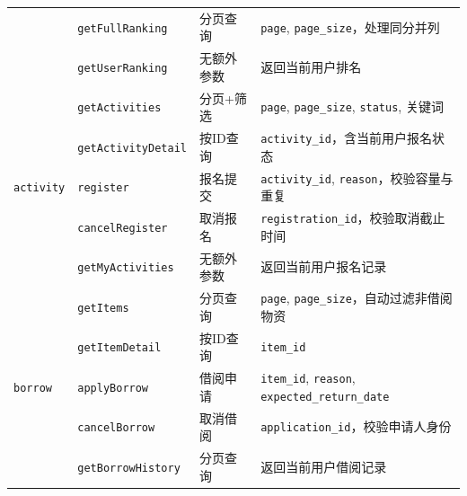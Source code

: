 \documentclass[a4paper,12pt]{article}
\begin{document}
\begin{table}[H]
{\begin{tabular}{p{2.4cm} p{3.6cm} p{2.6cm} p{5.2cm}}
                                               & \texttt{getFullRanking}     & 分页查询          & \texttt{page}, \texttt{page\_size}，处理同分并列                           \\
                                               & \texttt{getUserRanking}     & 无额外参数         & 返回当前用户排名                                                            \\
      \midrule
      \multirow{5}{*}{\texttt{activity}}       & \texttt{getActivities}      & 分页+筛选         & \texttt{page}, \texttt{page\_size}, \texttt{status}, 关键词            \\
                                               & \texttt{getActivityDetail}  & 按ID查询         & \texttt{activity\_id}，含当前用户报名状态                                     \\
                                               & \texttt{register}           & 报名提交          & \texttt{activity\_id}, \texttt{reason}，校验容量与重复                      \\
                                               & \texttt{cancelRegister}     & 取消报名          & \texttt{registration\_id}，校验取消截止时间                                  \\
                                               & \texttt{getMyActivities}    & 无额外参数         & 返回当前用户报名记录                                                          \\
      \midrule
      \multirow{6}{*}{\texttt{borrow}}         & \texttt{getItems}           & 分页查询          & \texttt{page}, \texttt{page\_size}，自动过滤非借阅物资                        \\
                                               & \texttt{getItemDetail}      & 按ID查询         & \texttt{item\_id}                                                   \\
                                               & \texttt{applyBorrow}        & 借阅申请          & \texttt{item\_id}, \texttt{reason}, \texttt{expected\_return\_date} \\
                                               & \texttt{cancelBorrow}       & 取消借阅          & \texttt{application\_id}，校验申请人身份                                    \\
                                               & \texttt{getBorrowHistory}   & 分页查询          & 返回当前用户借阅记录                                                          \\

\end{tabular}}
\end{table}
\end{document}

